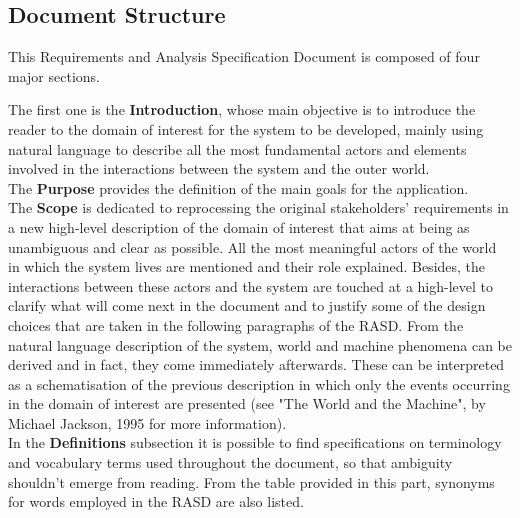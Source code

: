 \subsection{Document Structure}
This Requirements and Analysis Specification Document is composed of four major sections.

The first one is the \textbf{Introduction}, whose main objective is to introduce the reader to the domain of interest for the system to be developed, mainly using natural language to describe all the most fundamental actors and elements involved in the interactions between the system and the outer world.\\
The \textbf{Purpose} provides the definition of the main goals for the application.\\
The \textbf{Scope} is dedicated to reprocessing the original stakeholders' requirements in a new high-level description of the domain of interest that aims at being as unambiguous and clear as possible. All the most meaningful actors of the world in which the system lives are mentioned and their role explained. Besides, the interactions between these actors and the system are touched at a high-level to clarify what will come next in the document and to justify some of the design choices that are taken in the following paragraphs of the RASD. From the natural language description of the system, world and machine phenomena can be derived and in fact, they come immediately afterwards. These can be interpreted as a schematisation of the previous description in which only the events occurring in the domain of interest are presented (see  "The World and the Machine", by Michael Jackson, 1995 for more information).\\
In the \textbf{Definitions} subsection it is possible to find specifications on terminology and vocabulary terms used throughout the document, so that ambiguity shouldn't emerge from reading. From the table provided in this part, synonyms for words employed in the RASD are also listed.

